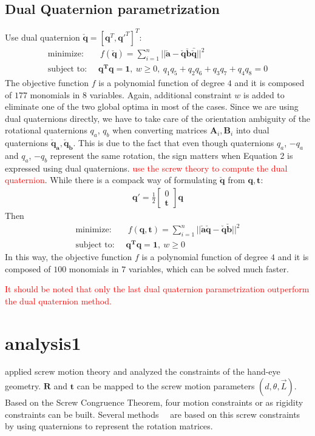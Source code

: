 \documentclass[a4paper]{report}
\begin{document}
\subsection{Dual Quaternion parametrization}
Use dual quaternion $\check{\mathbf{q}}=[\mathbf{q}^T, \mathbf{q'}^T]^T$:
\begin{align}
\text{minimize: }\ &\ f(\mathbf{\check{q}})=\sum_{i=1}^{n} 
||\mathbf{\check{a}-\check{q}\check{b}\bar{\check{q}}}||^2 \\
\text{subject to: }\ & \mathbf{q^Tq=1},\ w \geq 0,\ q_1q_5+q_2q_6+q_3q_7+q_4q_8=0
\end{align}
The objective function $f$ is a polynomial function of degree $4$ and it is composed of $177$ monomials in $8$ variables. Again, additional constraint $w$ is added to eliminate one of the two global optima in most of the
cases. Since we are using dual quaternions directly, we have to take care of the orientation ambiguity of the rotational quaternions $q_a$, $q_b$ when converting matrices $\mathbf{A}_i, \mathbf{B}_i$ into dual quaternions $\mathbf{\check{q}_a}, \mathbf{\check{q}_b}$. This is due to the fact that even though quaternions $q_a$, $-q_a$ and $q_a$, $-q_b$ represent the same rotation, the sign matters when Equation 2 is expressed using dual
quaternions. \textcolor{red}{use the screw theory to compute the dual quaternion}.
While there is a compack way of formulating $\mathbf{\check{q}}$ from $\mathbf{q, t}$:
\begin{align}
\mathbf{q'}=\frac{1}{2} \left[ \begin{matrix}
0 \\ \mathbf{t}
\end{matrix}\right]\mathbf{q}
\end{align}
Then
\begin{align}
\text{minimize: }\ &\ f(\mathbf{q, t})=\sum_{i=1}^{n} 
||\mathbf{\check{a}\check{q}-\check{q}\check{b}}||^2 \\
\text{subject to: }\ & \mathbf{q^Tq=1},\ w \geq 0
\end{align}
In this way, the objective function $f$ is a polynomial function of degree $4$ and it is composed of $100$ monomials in $7$ variables, which can be solved much faster.

\textcolor{red}{It should be noted that only the last dual quaternion parametrization outperform the dual quaternion method.}

\section{analysis1}
\cite{chen1991screw} applied screw motion theory and analyzed the constraints of the hand-eye geometry. $\mathbf{R}$ and $\mathbf{t}$ can be mapped to the screw motion parameters $(d, \theta, \vec{L})$. Based on the Screw Congruence Theorem, four motion constraints or
as rigidity constraints can be built. Several methods~\cite{fassi2005hand}~\cite{zhao2009hand} are based on this screw constraints by using quaternions to represent the rotation matrices.
\end{document}
